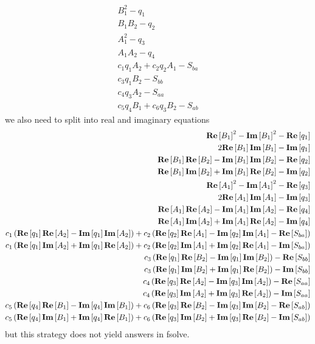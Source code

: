 \begin{align}
	B_1^2 - q_1  \\
	B_1 B_2  - q_2 \\
	A_1^2 - q_3 \\
	A_1 A_2  - q_4 \\
	c_1 q_1 A_2+ c_2 q_2 A_1 - S_{ba}  \\
	c_3 q_1 B_2 - S_{bb} \\
	c_4 q_3 A_2 - S_{aa} \\
	c_5 q_4 B_1 + c_6 q_3 B_2 - S_{ab}
\end{align}
we also need to split into real and imaginary equations
\begin{align*}
	\real{B_1}^2 - \imag{B_1}^2 - \real{q_1}  \\
	2\real{B_1}\imag{B_1} - \imag{q_1}  \\
	\real{B_1}\real{ B_2} - \imag{B_1} \imag{B_2}  - \real{q_2} \\
	\real{B_1}\imag{ B_2} + \imag{B_1} \real{B_2}  - \imag{q_2} \\
	\real{A_1}^2 - \imag{A_1}^2 - \real{q_3} \\
	2 \real{A_1}\imag{A_1} - \imag{q_3} \\
	\real{A_1}\real{ A_2} - \imag{A_1} \imag{A_2}  - \real{q_4} \\
	\real{A_1}\imag{ A_2} + \imag{A_1} \real{A_2}  - \imag{q_4} \\
	c_1 \left( \real{q_1} \real{A_2} - \imag{q_1} \imag{A_2}  \right) + c_2 \left( \real{q_2} \real{A_1} - \imag{q_2} \imag{A_1}  - \real{S_{ba}} \right) \\
	c_1 \left( \real{q_1} \imag{A_2} + \imag{q_1} \real{A_2}  \right) + c_2 \left( \real{q_2} \imag{A_1} + \imag{q_2} \real{A_1}  - \imag{S_{ba}} \right) \\
	c_3 \left( \real{q_1} \real{B_2} - \imag{q_1} \imag{B_2}  \right) - \real{S_{bb}} \\
	c_3 \left( \real{q_1} \imag{B_2} + \imag{q_1} \real{B_2}  \right) - \imag{S_{bb}} \\
	c_4 \left( \real{q_3} \real{A_2} - \imag{q_3} \imag{A_2}  \right) - \real{S_{aa}} \\
	c_4 \left( \real{q_3} \imag{A_2} + \imag{q_3} \real{A_2}  \right) - \imag{S_{aa}} \\
	c_5 \left( \real{q_4} \real{B_1} - \imag{q_4} \imag{B_1}  \right) + c_6 \left( \real{q_3} \real{B_2} - \imag{q_3} \imag{B_2}  - \real{S_{ab}} \right) \\
	c_5 \left( \real{q_4} \imag{B_1} + \imag{q_4} \real{B_1}  \right) + c_6 \left( \real{q_3} \imag{B_2} + \imag{q_3} \real{B_2}  - \imag{S_{ab}} \right)
\end{align*}
but this strategy does not yield answers in fsolve.

